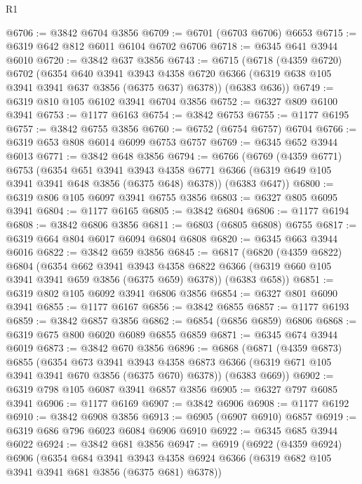 \begin{lexlean}{R1}
\begin{coremodule}
@6706 := @3842 @6704 @3856
@6709 := @6701 (@6703 @6706) @6653
@6715 := @6319 @642 @812 @6011 @6104 @6702 @6706
@6718 := @6345 @641 @3944 @6010
@6720 := @3842 @637 @3856
@6743 := @6715
    (@6718
      (@4359 @6720)
      @6702
      (@6354
        @640
        @3941
        @3943
        @4358
        @6720
        @6366
        (@6319 @638 @105 @3941 @3941 @637 @3856 (@6375 @637) @6378))
      (@6383 @636))
@6749 := @6319 @810 @105 @6102 @3941 @6704 @3856
@6752 := @6327 @809 @6100 @3941
@6753 := @1177 @6163
@6754 := @3842 @6753
@6755 := @1177 @6195
@6757 := @3842 @6755 @3856
@6760 := @6752 (@6754 @6757) @6704
@6766 := @6319 @653 @808 @6014 @6099 @6753 @6757
@6769 := @6345 @652 @3944 @6013
@6771 := @3842 @648 @3856
@6794 := @6766
    (@6769
      (@4359 @6771)
      @6753
      (@6354
        @651
        @3941
        @3943
        @4358
        @6771
        @6366
        (@6319 @649 @105 @3941 @3941 @648 @3856 (@6375 @648) @6378))
      (@6383 @647))
@6800 := @6319 @806 @105 @6097 @3941 @6755 @3856
@6803 := @6327 @805 @6095 @3941
@6804 := @1177 @6165
@6805 := @3842 @6804
@6806 := @1177 @6194
@6808 := @3842 @6806 @3856
@6811 := @6803 (@6805 @6808) @6755
@6817 := @6319 @664 @804 @6017 @6094 @6804 @6808
@6820 := @6345 @663 @3944 @6016
@6822 := @3842 @659 @3856
@6845 := @6817
    (@6820
      (@4359 @6822)
      @6804
      (@6354
        @662
        @3941
        @3943
        @4358
        @6822
        @6366
        (@6319 @660 @105 @3941 @3941 @659 @3856 (@6375 @659) @6378))
      (@6383 @658))
@6851 := @6319 @802 @105 @6092 @3941 @6806 @3856
@6854 := @6327 @801 @6090 @3941
@6855 := @1177 @6167
@6856 := @3842 @6855
@6857 := @1177 @6193
@6859 := @3842 @6857 @3856
@6862 := @6854 (@6856 @6859) @6806
@6868 := @6319 @675 @800 @6020 @6089 @6855 @6859
@6871 := @6345 @674 @3944 @6019
@6873 := @3842 @670 @3856
@6896 := @6868
    (@6871
      (@4359 @6873)
      @6855
      (@6354
        @673
        @3941
        @3943
        @4358
        @6873
        @6366
        (@6319 @671 @105 @3941 @3941 @670 @3856 (@6375 @670) @6378))
      (@6383 @669))
@6902 := @6319 @798 @105 @6087 @3941 @6857 @3856
@6905 := @6327 @797 @6085 @3941
@6906 := @1177 @6169
@6907 := @3842 @6906
@6908 := @1177 @6192
@6910 := @3842 @6908 @3856
@6913 := @6905 (@6907 @6910) @6857
@6919 := @6319 @686 @796 @6023 @6084 @6906 @6910
@6922 := @6345 @685 @3944 @6022
@6924 := @3842 @681 @3856
@6947 := @6919
    (@6922
      (@4359 @6924)
      @6906
      (@6354
        @684
        @3941
        @3943
        @4358
        @6924
        @6366
        (@6319 @682 @105 @3941 @3941 @681 @3856 (@6375 @681) @6378))

\end{coremodule}
\end{lexlean}
